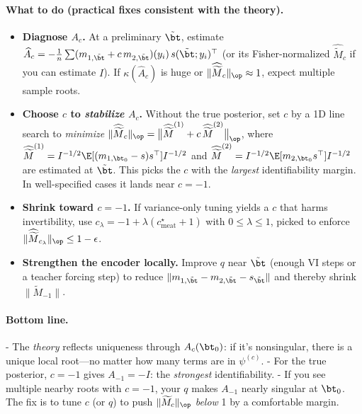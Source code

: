 \paragraph{What to do (practical fixes consistent with the theory).}
\begin{itemize}
\item \textbf{Diagnose \(A_c\).} At a preliminary \(\tilde\bt\), estimate
\(\widehat A_c=-\frac1n\sum (m_{1,\tilde\bt}+c\,m_{2,\tilde\bt})(y_i)\,s(\tilde\bt;y_i)^\top\)
(or its Fisher-normalized \(\widehat{\widetilde M}_c\) if you can estimate \(I\)).
If \(\kappa(\widehat A_c)\) is huge or \(\|\widehat{\widetilde M}_c\|_{\op}\approx 1\),
expect multiple sample roots.
\item \textbf{Choose \(c\) to \emph{stabilize} \(A_c\).}
Without the true posterior, set \(c\) by a 1D line search to \emph{minimize}
\(\|\widehat{\widetilde M}_c\|_{\op}=\big\|\widehat{\widetilde M}^{(1)}+c\,\widehat{\widetilde M}^{(2)}\big\|_{\op}\),
where \(\widehat{\widetilde M}^{(1)}=I^{-1/2}\E[(m_{1,\bt_0}-s)s^\top]I^{-1/2}\) and
\(\widehat{\widetilde M}^{(2)}=I^{-1/2}\E[m_{2,\bt_0}s^\top]I^{-1/2}\) are estimated
at \(\tilde\bt\). This picks the \(c\) with the \emph{largest} identifiability margin.
In well-specified cases it lands near \(c=-1\).
\item \textbf{Shrink toward \(c=-1\).} If variance-only tuning yields a \(c\)
that harms invertibility, use \(c_\lambda=-1+\lambda(c_{\text{meat}}^\star+1)\)
with \(0\le\lambda\le1\), picked to enforce \(\|\widehat{\widetilde M}_{c_\lambda}\|_{\op}\le 1-\epsilon\).
\item \textbf{Strengthen the encoder locally.} Improve \(q\) near \(\tilde\bt\)
(enough VI steps or a teacher forcing step) to reduce
\(\|m_{1,\tilde\bt}-m_{2,\tilde\bt}-s_{\tilde\bt}\|\) and thereby shrink
\(\|\widetilde M_{-1}\|\).
\end{itemize}

\paragraph{Bottom line.}
- The \emph{theory} reflects uniqueness through \(A_c(\bt_0)\): if it’s nonsingular, there is a unique local root—no matter how many terms are in \(\psi^{(c)}\).  
- For the true posterior, \(c=-1\) gives \(A_{-1}=-I\): the \emph{strongest}
identifiability.  
- If you see multiple nearby roots with \(c=-1\), your \(q\) makes
\(A_{-1}\) nearly singular at \(\bt_0\). The fix is to tune \(c\) (or \(q\))
to push \(\|\widetilde M_c\|_{\op}\) \emph{below} 1 by a comfortable margin.


